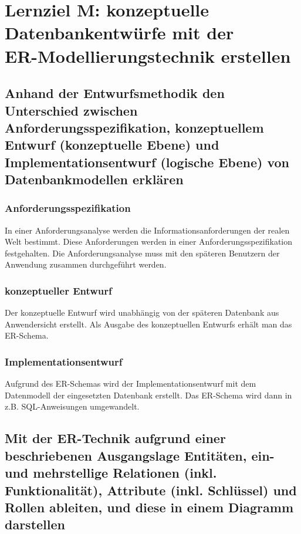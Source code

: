 \section{Lernziel M: konzeptuelle Datenbankentwürfe mit der \\ ER-Modellierungstechnik erstellen}

\subsection{Anhand der Entwurfsmethodik den Unterschied zwischen
Anforderungsspezifikation, konzeptuellem Entwurf (konzeptuelle Ebene)
und Implementationsentwurf (logische Ebene) von Datenbankmodellen
erklären}

\subsubsection{Anforderungsspezifikation}

In einer Anforderungsanalyse werden die Informationsanforderungen der realen Welt bestimmt. Diese Anforderungen werden in einer Anforderungsspezifikation festgehalten. Die Anforderungsanalyse muss mit den späteren Benutzern der Anwendung zusammen durchgeführt werden.

\subsubsection{konzeptueller Entwurf}

Der konzeptuelle Entwurf wird unabhängig von der späteren Datenbank aus Anwendersicht erstellt. Als Ausgabe des konzeptuellen Entwurfs erhält man das ER-Schema.

\subsubsection{Implementationsentwurf}

Aufgrund des ER-Schemas wird der Implementationsentwurf mit dem Datenmodell der eingesetzten Datenbank erstellt. Das ER-Schema wird dann in z.B. SQL-Anweisungen umgewandelt.

\subsection{Mit der ER-Technik aufgrund einer beschriebenen Ausgangslage Entitäten, ein- und mehrstellige Relationen (inkl. Funktionalität), Attribute (inkl. Schlüssel) und Rollen ableiten, und diese in einem Diagramm darstellen}

